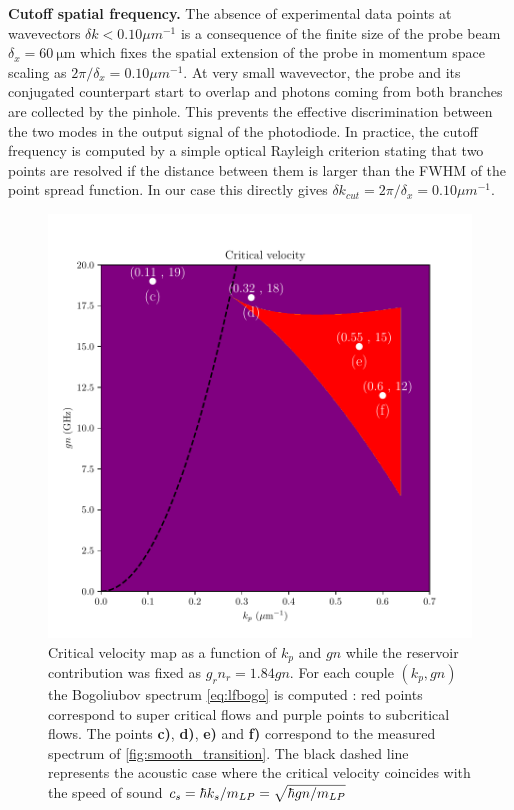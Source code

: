 \textbf{Cutoff spatial frequency.} The absence of experimental data points at wavevectors $\delta k < 0.10 \mu m^{-1}$ is a consequence of the finite size 
of the probe beam $\delta_x = \SI{60}{\micro\meter}$ which fixes the spatial extension of the probe in momentum space
 scaling as $2\pi/\delta_x=0.10 \mu m^{-1}$. At very small wavevector, the probe and its conjugated counterpart start to overlap and photons
 coming from both branches are collected by the pinhole. This prevents the effective discrimination between the two modes in the output signal of the photodiode. In practice, the 
 cutoff frequency is computed by a simple optical Rayleigh criterion stating that two points are resolved if the distance between them is larger than the FWHM of the point spread function.
In our case this directly gives $\delta k_{cut} = 2\pi/\delta_x= 0.10 \mu m^{-1}$.
\begin{figure}[h]
    \centering
    \includegraphics[width=1\textwidth]{chap_custom_st/fig/critical_velocity_map.pdf}
    \caption{Critical velocity map as a function of $k_p$ and $gn$ while the reservoir contribution was fixed as $g_rn_r= 1.84gn$. For each couple $(k_p,gn)$ the Bogoliubov spectrum \autoref{eq:lfbogo} is computed : red points correspond to super critical flows and purple points to subcritical flows.
    The points \textbf{c)}, \textbf{d)}, \textbf{e)} and \textbf{f)} correspond to the measured spectrum of \autoref{fig:smooth_transition}. The black dashed line represents the acoustic case where the critical velocity coincides with the speed of sound $c_s = \hbar k_s/m_{LP}=\sqrt{\hbar gn/m_{LP}}$ }
    \label{fig:critical_velocity_map}
\end{figure}
\clearpage





